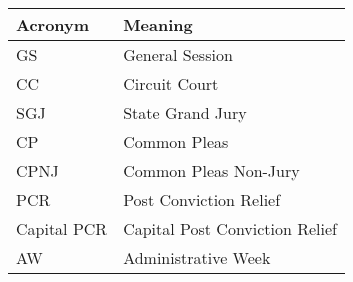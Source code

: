 \begin{tabular}{L{20mm}L{50mm}}
  \hline
  Acronym & Meaning  \\
  \hline
  GS & General Session \\
  CC & Circuit Court \\
  SGJ & State Grand Jury \\
  CP & Common Pleas \\
  CPNJ & Common Pleas Non-Jury \\
  PCR & Post Conviction Relief  \\
  Capital PCR & Capital Post Conviction Relief  \\
  AW & Administrative Week \\
  \hline
\end{tabular}
